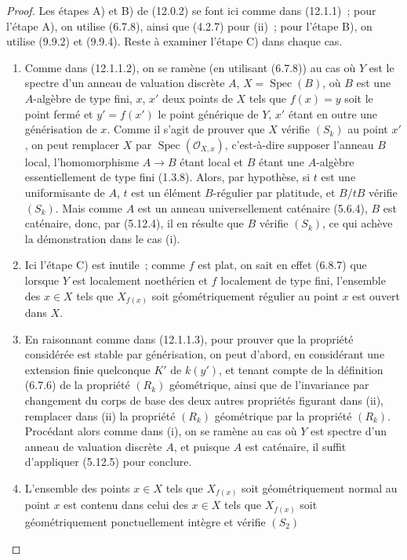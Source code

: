\begin{proof}
Les étapes A) et B) de (12.0.2) se font ici comme dans (12.1.1)~; pour l'étape
A), on utilise (6.7.8), ainsi que (4.2.7) pour (ii)~; pour l'étape B), on
utilise (9.9.2) et (9.9.4). Reste à examiner l'étape C) dans chaque cas.
\begin{enumerate}[label=(\roman*)]
  \item[(i)] Comme dans (12.1.1.2), on se ramène (en utilisant (6.7.8)) au cas
  où $Y$ est le spectre d'un anneau de valuation discrète $A$,
  $X=\operatorname{Spec}(B)$, où $B$ est une $A$-algèbre de type fini, $x$,
  $x'$ deux points de $X$ tels que $f(x)=y$ soit le point fermé et
  $y'=f(x')$ le point générique de $Y$, $x'$ étant en outre une générisation
  de $x$. Comme il s'agit de prouver que $X$ vérifie $(S_k)$ au point $x'$,
  on peut remplacer $X$ par $\operatorname{Spec}(\mathcal O_{X,x})$,
  c'est-à-dire supposer l'anneau $B$ local, l'homomorphisme $A\to B$ étant
  local et $B$ étant une $A$-algèbre essentiellement de type fini (1.3.8).
  Alors, par hypothèse, si $t$ est une uniformisante de $A$, $t$ est un
  élément $B$-régulier par platitude, et $B/tB$ vérifie $(S_k)$. Mais comme
  $A$ est un anneau universellement caténaire (5.6.4), $B$ est caténaire,
  donc, par (5.12.4), il en résulte que $B$ vérifie $(S_k)$, ce qui achève la
  démonstration dans le cas (i).
  \item[(iii)] Ici l'étape C) est inutile~; comme $f$ est plat, on sait en
  effet (6.8.7) que lorsque $Y$ est localement noethérien et $f$ localement de
  type fini, l'ensemble des $x\in X$ tels que $X_{f(x)}$ soit géométriquement
  régulier au point $x$ est ouvert dans $X$.
  \item[(ii)] En raisonnant comme dans (12.1.1.3), pour prouver que la propriété
  considérée est stable par générisation, on peut d'abord, en considérant une
  extension finie quelconque $K'$ de $k(y')$, et tenant compte de la définition
  (6.7.6) de la propriété $(R_k)$ géométrique, ainsi que de l'invariance par
  changement du corps de base des deux autres propriétés figurant dans (ii),
  remplacer dans (ii) la propriété $(R_k)$ géométrique par la propriété
  $(R_k)$. Procédant alors comme dans (i), on se ramène au cas où $Y$ est
  spectre d'un anneau de valuation discrète $A$, et puisque $A$ est caténaire,
  il suffit d'appliquer (5.12.5) pour conclure.
  \item[(iv)] L'ensemble des points $x\in X$ tels que $X_{f(x)}$ soit
  géométriquement normal au point $x$ est contenu dans celui des $x\in X$ tels
  que $X_{f(x)}$ soit géométriquement ponctuellement intègre et vérifie $(S_2)$

\end{enumerate}
\end{proof}
